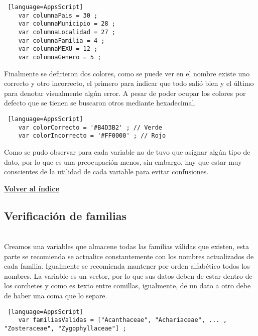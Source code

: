 \documentclass[12pt]{article} %
\begin{document}
    \begin{lstlisting} [language=AppsScript]
    var columnaPais = 30 ; 
    var columnaMunicipio = 28 ;
    var columnaLocalidad = 27 ;
    var columnaFamilia = 4 ;
    var columnaMEXU = 12 ;
    var columnaGenero = 5 ;
    \end{lstlisting}

    Finalmente se defirieron dos colores, como se puede ver en el nombre existe uno correcto y otro incorrecto, el primero para indicar que todo salió bien y el último para denotar visualmente algún error. A pesar de poder ocupar los colores por defecto que se tienen se buscaron otros mediante hexadecimal.

    \begin{lstlisting} [language=AppsScript]
    var colorCorrecto = '#B4D3B2' ; // Verde
    var colorIncorrecto = '#FF0000' ; // Rojo
    \end{lstlisting}

    Como se pudo observar para cada variable no de tuvo que asignar algún tipo de dato, por lo que es una preocupación menos, sin embargo, hay que estar muy conscientes de la utilidad de cada variable para evitar confusiones.
    

            \begin{flushright}
                \hyperlink{toc}{\textbf{Volver al índice}}
            \end{flushright}


    \subsection*{Verificación de familias}
    \\

    Creamos una variables que almacene todas las familias válidas que existen, esta parte se recomienda se actualice constantemente con los nombres actualizados de cada familia. Igualmente se recomienda mantener por orden alfabético todos los nombres. La variable es un vector, por lo que sus datos deben de estar dentro de los corchetes y como es texto entre comillas, igualmente, de un dato a otro debe de haber una coma que lo separe.

    \begin{lstlisting} [language=AppsScript]
    var familiasValidas = ["Acanthaceae", "Achariaceae", ... , "Zosteraceae", "Zygophyllaceae"] ;
    \end{lstlisting}  \\
\end{document}
